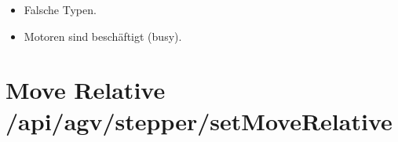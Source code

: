 \documentclass[letterpaper,10pt,english]{sphinxmanual}
\begin{document}
\sphinxAtStartPar
{}

\begin{sphinxVerbatim}[commandchars=\\\{\}]
\end{sphinxVerbatim}

\sphinxAtStartPar
{}

\begin{sphinxVerbatim}[commandchars=\\\{\}]
\end{sphinxVerbatim}

\sphinxAtStartPar
{}
\begin{itemize}
\item {} 
\sphinxAtStartPar
{} \textendash{} Falsche Typen.

\item {} 
\sphinxAtStartPar
{} \textendash{} Motoren sind beschäftigt (busy).

\end{itemize}


\section{Move Relative \textendash{} /api/agv/stepper/setMoveRelative}
\label{\detokenize{agv_rest_api_stepper:move-relative-api-agv-stepper-setmoverelative}}\label{\detokenize{agv_rest_api_stepper:post-api-agv-stepper-setmoverelative}}
\end{document}
